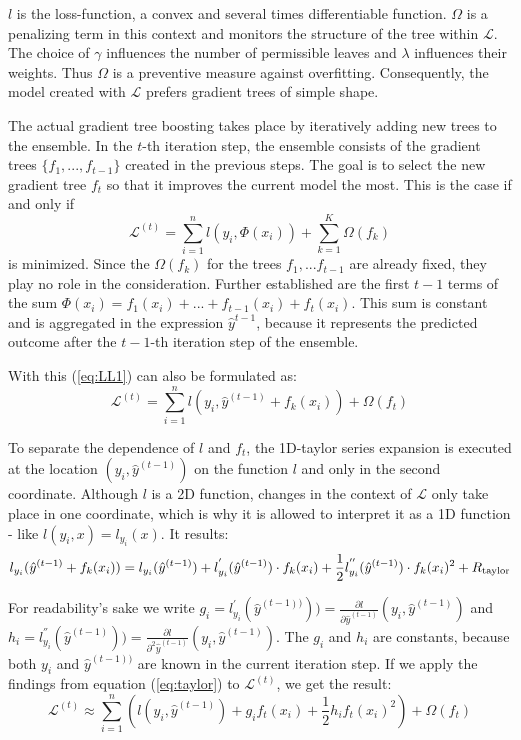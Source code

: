 \documentclass[a4paper,12pt]{scrartcl}
\newcommand{\LL}{\ensuremath{\mathcal{L}}}
\begin{document}
$l$ is the loss-function, a convex and several times differentiable function. $\Omega$ is a penalizing term in this context and monitors the structure of the tree within $\LL$. The choice of $\gamma$ influences the number of permissible leaves and $\lambda$ influences their weights. Thus $\Omega$ is a preventive measure against overfitting. Consequently, the model created with $\LL$ prefers gradient trees of simple shape.

The actual gradient tree boosting takes place by iteratively adding new trees to the ensemble. In the $t$-th iteration step, the ensemble consists of the gradient trees $\{f_1, ... , f_{t-1}\}$ created in the previous steps. The goal is to select the new gradient tree $f_t$ so that it improves the current model the most. This is the case if and only if 
\begin{equation}
\LL^{(t)} = \sum_{i=1}^{n} l(y_i, \Phi(x_i)) + \sum_{k=1}^{K}\Omega(f_k)
\label{eq:LL1}
\end{equation}
is minimized.
Since the $\Omega(f_k)$ for the trees $f_1, ... f_{t-1}$ are already fixed, they play no role in the consideration. Further established are the first $t-1$ terms of the sum $\Phi(x_i) = f_1(x_i) + ... + f_{t-1}(x_i) + f_t(x_i)$. This sum is constant and is aggregated in the expression $\hat{y}^{t-1}$, because it represents the predicted outcome after the $t-1$-th iteration step of the ensemble.

With this (\ref{eq:LL1}) can also be formulated as:
\begin{equation}
\LL^{(t)} = \sum_{i=1}^{n} l(y_i, \hat{y}^{(t-1)} + f_k(x_i)) + \Omega(f_t)
\label{eq:LL2}
\end{equation}

To separate the dependence of $l$ and $f_t$, the 1D-taylor series expansion is executed at the location $(y_i,\hat{y}^{(t-1)})$ on the function $l$ and only in the second coordinate. Although $l$ is a 2D function, changes in the context of $\LL$ only take place in one coordinate, which is why it is allowed to interpret it as a 1D function - like $l(y_i,x) = l_{y_i}(x)$. It results:
\begin{equation}
\label{eq:taylor}
l_{y_i}(\hat{y}^{(t-1)} + f_k(x_i)) = l_{y_i}(\hat{y}^{(t-1)}) + l_{y_i}^{'}(\hat{y}^{(t-1)}) \cdot f_k(x_i)
+ \newline \frac{1}{2} l_{y_i}^{''}(\hat{y}^{(t-1)}) \cdot f_k(x_i)^2 + R_\text{taylor}
\end{equation}

For readability's sake we write $g_i = l_{y_i}^{'}(\hat{y}^{(t-1))}) ) = \frac{\partial l}{\partial \hat{y}^{(t-1)}}(y_i,\hat{y}^{(t-1)})$ and $h_i = l_{y_i}^{''}(\hat{y}^{(t-1)}) ) = \frac{\partial l}{\partial^2 \hat{y}^{(t-1)}}(y_i,\hat{y}^{(t-1)})$. The $g_i$ and $h_i$ are constants, because both $y_i$ and $\hat{y}^{(t-1))}$ are known in the current iteration step. If we apply the findings from equation (\ref{eq:taylor}) to $\LL^{(t)}$, we get the result:
\begin{equation}
\LL^{(t)} \approx \sum_{i=1}^{n} (l(y_i,\hat{y}^{(t-1)}) + g_if_t(x_i) + \frac{1}{2} h_i f_t(x_i)^2) + \Omega(f_t)
\end{equation}
\end{document}
